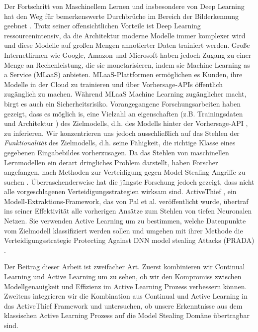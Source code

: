 
\Abstract
Der Fortschritt von Maschinellem Lernen und insbesondere von Deep Learning hat den Weg für bemerkenswerte Durchbrüche im Bereich der Bilderkennung geebnet \cite{he2016deep}
\cite{goodfellow2020generative} \cite{lecun1989backpropagation}. Trotz seiner offensichtlichen Vorteile ist Deep Learning ressourcenintensiv, da die Architektur moderne Modelle 
immer komplexer wird und diese Modelle auf großen Mengen annotierter Daten trainiert werden. Große Internetfirmen wie Google, Amazon und Microsoft haben jedoch Zugang zu einer 
Menge an Rechenleistung, die sie monetarisieren, indem sie Machine Learning as a Service (MLaaS) anbieten. MLaaS-Plattformen ermöglichen es Kunden, ihre Modelle in der Cloud
zu trainieren und über Vorhersage-APIs öffentlich zugänglich zu machen. Während MLaaS Machine Learning zugänglicher macht, birgt es auch ein Sicherheitsrisiko. Vorangegangene
Forschungsarbeiten haben gezeigt, dass es möglich is, eine Vielzahl an eigenschaften (z.B. Trainingsdaten \cite{shokri2017membership} und Architektur \cite{oh2019towards}) des
Zielmodells, d.h. des Modells hinter der Vorhersage-API \cite{tramer2016stealing} \cite{papernot2017practical}, zu inferieren. Wir konzentrieren uns jedoch ausschließlich auf
das Stehlen der \textit{Funktionalität} des Zielmodells, d.h. seine Fähigkeit, die richtige Klasse eines gegebenen Eingabebildes vorherzusagen. Da das Stehlen von maschinellen
Lernmodellen ein derart dringliches Problem darstellt, haben Forscher angefangen, nach Methoden zur Verteidigung gegen Model Stealing Angriffe zu suchen \cite{orekondy2019prediction}
\cite{juuti2019prada}. Überraschenderweise hat die jüngste Forschung jedoch gezeigt, dass nicht alle vorgeschlagenen Verteidigungsstrategien wirksam sind. ActiveThief \cite{pal2020activethief},
ein Modell-Extraktions-Framework, das von Pal et al. veröffentlicht wurde, übertraf ins seiner Effektivität alle vorherigen Ansätze zum Stehlen von tiefen Neuronalen Netzen. Sie verwenden
Active Learning um zu bestimmen, welche Datenpunkte vom Zielmodell klassifiziert werden sollen und umgehen mit ihrer Methode die Verteidigungsstrategie Protecting Against DNN model stealing
Attacks (PRADA) \cite{juuti2019prada}. \par
Der Beitrag dieser Arbeit ist zweifacher Art. Zuerst kombinieren wir Continual Learning und Active Learning um zu sehen, ob wir den Kompromiss zwischen Modellgenauigkeit und Effizienz im 
Active Learning Prozess verbessern können. Zweitens integrieren wir die Kombination aus Continual und Active Learning in das ActiveThief Framework und untersuchen, ob unsere Erkenntnisse aus
dem klassischen Active Learning Prozess auf die Model Stealing Domäne übertragbar sind.
